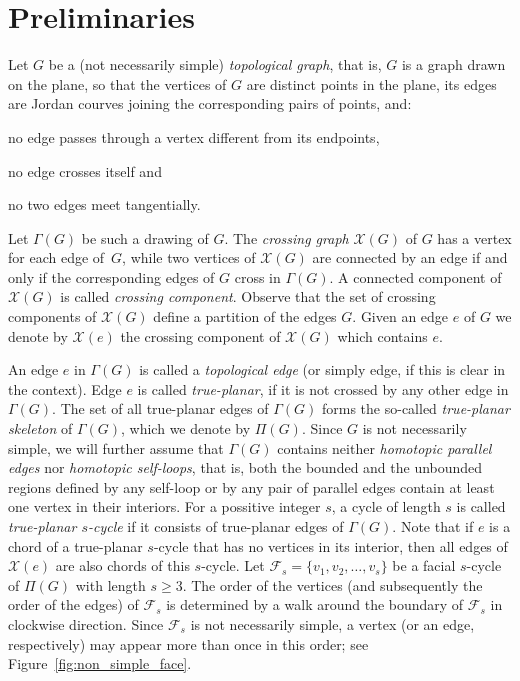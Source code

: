 \section{Preliminaries}
\label{sec:preliminaries}

Let $G$ be a (not necessarily simple) \emph{topological graph}, that is, $G$ is a graph drawn on the plane, so that the vertices of $G$ are distinct points in the plane, its edges are Jordan courves joining the corresponding pairs of points, and:%
%
\begin{inparaenum}[(i)]
\item no edge passes through a vertex different from its endpoints, 
\item no edge crosses itself and 
\item no two edges meet tangentially.
\end{inparaenum}
Let $\Gamma(G)$ be such a drawing of $G$. The \emph{crossing graph} $\mathcal{X}(G)$ of $G$ has a vertex for each edge of~$G$, while two vertices of $\mathcal{X}(G)$ are connected by an edge if and only if the corresponding edges of $G$ cross in $\Gamma(G)$. A connected component of $\mathcal{X}(G)$ is called \emph{crossing component}. Observe that the set of crossing components of $\mathcal{X}(G)$ define a partition of the edges $G$. Given an edge $e$ of $G$ we denote by $\mathcal{X}(e)$ the crossing component of $\mathcal{X}(G)$ which contains $e$. 

An edge $e$ in $\Gamma(G)$ is called a \emph{topological edge} (or simply edge, if this is clear in the context). Edge $e$ is called \emph{true-planar}, if it is not crossed by any other edge in $\Gamma(G)$. The set of all true-planar edges of $\Gamma(G)$ forms the so-called \emph{true-planar skeleton} of $\Gamma(G)$, which we denote by $\Pi(G)$. Since $G$ is not necessarily simple, we will further assume that $\Gamma(G)$ contains neither \emph{homotopic parallel edges} nor \emph{homotopic self-loops}, that is, both the bounded and the unbounded regions defined by any self-loop or by any pair of parallel edges contain at least one vertex in their interiors. For a possitive integer $s$, a cycle of length $s$ is called \emph{true-planar $s$-cycle} if it consists of true-planar edges of $\Gamma(G)$. Note that if $e$ is a chord of a true-planar $s$-cycle that has no vertices in its interior, then all edges of $\mathcal{X}(e)$ are also chords of this $s$-cycle. Let $\mathcal{F}_s=\{v_1,v_2,\ldots,v_s\}$ be a facial $s$-cycle of $\Pi(G)$ with length $s \geq 3$.  The order of the vertices (and subsequently the order of the edges) of $\mathcal{F}_s$ is determined by a walk around the boundary of $\mathcal{F}_s$ in clockwise direction. Since $\mathcal{F}_s$ is not necessarily simple, a vertex (or an edge, respectively) may appear more than once in this order; see Figure~\ref{fig:non_simple_face}.

